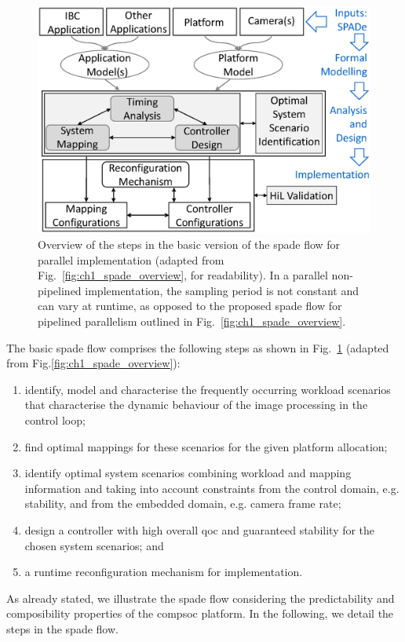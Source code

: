 \begin{figure}[tb]
    \centering
     \includegraphics[scale=0.45]{images/SPADe.eps}
    \caption{Overview of the steps in the basic version of the \gls{spade} flow for parallel implementation (adapted from Fig.\ \ref{fig:ch1_spade_overview}, for readability). In a parallel non-pipelined implementation, the sampling period is not constant and can vary at runtime, as opposed to the proposed \gls{spade} flow for pipelined parallelism outlined in Fig.\ \ref{fig:ch1_spade_overview}.}
    \label{fig:ch5_SPADeOverview}
\end{figure}

The basic \gls{spade} flow comprises the following steps as shown in Fig.~\ref{fig:ch5_SPADeOverview} (adapted from Fig.\ref{fig:ch1_spade_overview}): 
\begin{enumerate}
    \item identify, model and characterise the frequently occurring workload scenarios that characterise the dynamic behaviour of the image processing in the control loop;
    
    \item find optimal mappings for these scenarios for the given platform allocation;
    
    \item identify optimal system scenarios combining workload and mapping information and taking into account constraints from the control domain, e.g. stability, and from the embedded domain, e.g. camera frame rate; 
    
    \item design a controller with high overall \gls{qoc} and guaranteed stability for the chosen system scenarios; and

    \item a runtime reconfiguration mechanism for implementation.
\end{enumerate}
As already stated, we illustrate the \gls{spade} flow considering the predictability and composibility properties of the \gls{compsoc} platform. In the following, we detail the steps in the \gls{spade} flow.
